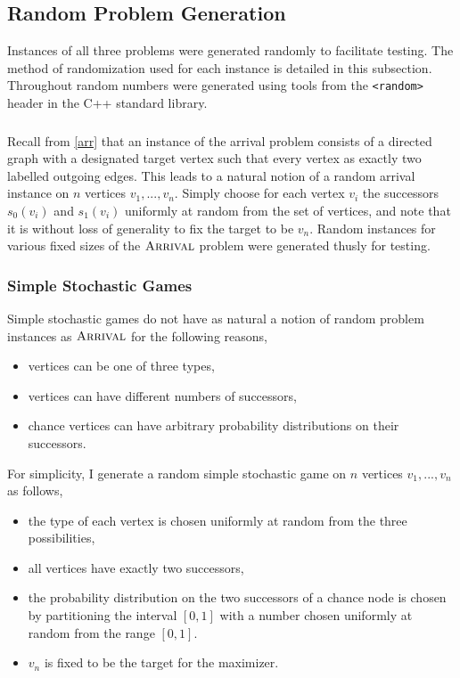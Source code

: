 \subsection{Random Problem Generation} \label{randomGen}
Instances of all three problems were generated randomly to facilitate testing. The method of randomization used
for each instance is detailed in this subsection. Throughout random numbers were generated using tools
from the \lstinline{<random>} header in the C++ standard library.

\subsubsection{\arr} \label{arrRandom}
Recall from \cref{arr} that an instance of the arrival problem consists of a directed graph with
a designated target vertex such that every vertex as exactly two labelled outgoing edges.
This leads to a natural notion of a random arrival instance on $n$ vertices $v_1, ..., v_n$.
Simply choose for each vertex $v_i$ the successors $s_0(v_i)$ and $s_1(v_i)$ uniformly at random
from the set of vertices, and note that it is without loss of generality to fix the target to be $v_n$.
Random instances for various fixed sizes of the $\textsc{Arrival}$ problem were generated thusly for testing.

\subsubsection{Simple Stochastic Games} \label{ssgRandom}
Simple stochastic games do not have as natural a notion of random problem instances as $\textsc{Arrival}$ for the following reasons,
\begin{itemize}
  \item vertices can be one of three types, 
  \item vertices can have different numbers of successors,
  \item chance vertices can have arbitrary probability distributions on their successors.
\end{itemize}
For simplicity, I generate a random simple stochastic game on $n$ vertices $v_1, ..., v_n$ as follows,
\begin{itemize}
  \item the type of each vertex is chosen uniformly at random from the three possibilities,
  \item all vertices have exactly two successors,
  \item the probability distribution on the two successors of a chance node is chosen by
    partitioning the interval $[0, 1]$ with a number chosen uniformly at random from the range $[0, 1]$.
  \item $v_n$ is fixed to be the target for the maximizer.
\end{itemize}

